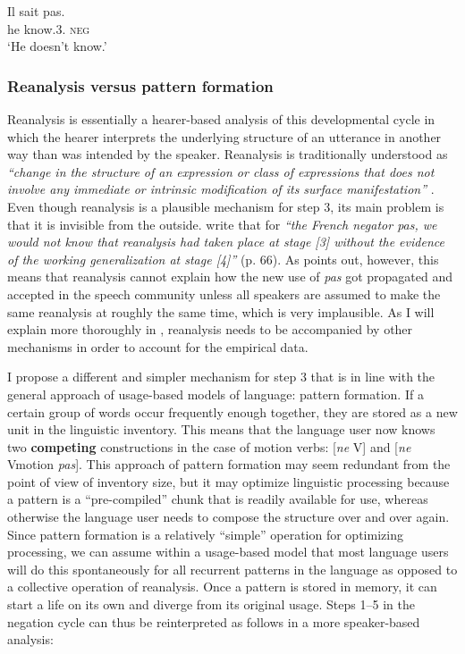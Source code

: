 \ea
\gll Il sait pas.\\
he know.3{\sg}.{\prs} {\textsc{neg}}\\
\glt `He doesn't know.'\\
\z 

\subsubsection{Reanalysis versus pattern formation}
 Reanalysis is essentially a hearer-based analysis of this developmental cycle in which the hearer interprets the underlying structure of an utterance in another way than was intended by the speaker. Reanalysis is traditionally understood as {\em ``change in the structure of an expression or class of expressions that does not involve any immediate or intrinsic modification of its surface manifestation''} \citep[58]{langacker77syntactic}. Even though reanalysis is a plausible mechanism for step 3, its main problem is that it is invisible from the outside. \citet{hopper93grammaticalization} write that for {\em ``the French negator {\em pas}, we would not know that reanalysis had taken place at stage [3] without the evidence of the working generalization at stage [4]''} (p. 66). As \citet{haspelmath98does} points out, however, this means that reanalysis cannot explain how the new use of {\em pas} got propagated and accepted in the speech community unless all speakers are assumed to make the same reanalysis at roughly the same time, which is very implausible. As I will explain more thoroughly in , reanalysis needs to be accompanied by other mechanisms in order to account for the empirical data.

I propose a different and simpler mechanism for step 3 that is in line with the general approach of usage-based models of language: pattern formation. If a certain group of words occur frequently enough together, they are stored as a new unit in the linguistic inventory. This means that the language user now knows two {\bfseries competing} constructions in the case of motion verbs: [{\em ne} V] and [{\em ne} Vmotion {\em pas}]. This approach of pattern formation may seem redundant from the point of view of inventory size, but it may optimize linguistic processing because a pattern is a ``pre-compiled'' chunk that is readily available for use, whereas otherwise the language user needs to compose the structure over and over again. Since pattern formation is a relatively ``simple'' operation for optimizing processing, we can assume within a usage-based model that most language users will do this spontaneously for all recurrent patterns in the language as opposed to a collective operation of reanalysis. Once a pattern is stored in memory, it can start a life on its own and diverge from its original usage. Steps 1--5 in the negation cycle can thus be reinterpreted as follows in a more speaker-based analysis:


